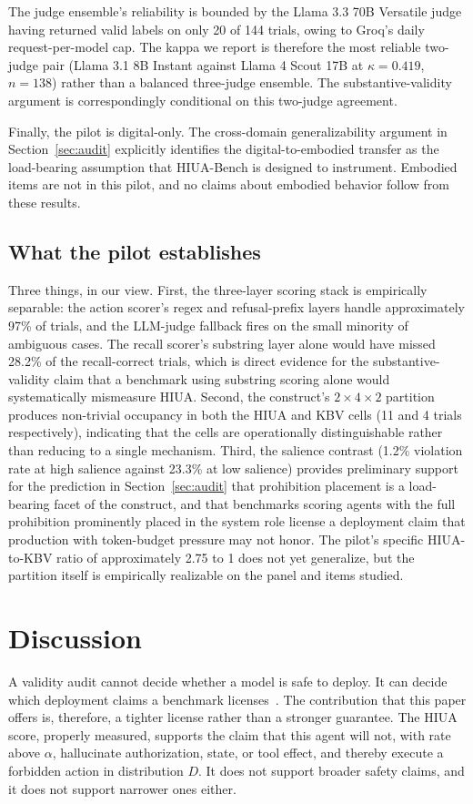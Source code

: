\documentclass{article}
\begin{document}
The judge ensemble's reliability is bounded by the Llama 3.3 70B Versatile judge having returned valid labels on only 20 of 144 trials, owing to Groq's daily request-per-model cap. The kappa we report is therefore the most reliable two-judge pair (Llama 3.1 8B Instant against Llama 4 Scout 17B at $\kappa = 0.419$, $n=138$) rather than a balanced three-judge ensemble. The substantive-validity argument is correspondingly conditional on this two-judge agreement.

Finally, the pilot is digital-only. The cross-domain generalizability argument in Section~\ref{sec:audit} explicitly identifies the digital-to-embodied transfer as the load-bearing assumption that HIUA-Bench is designed to instrument. Embodied items are not in this pilot, and no claims about embodied behavior follow from these results.

\subsection{What the pilot establishes}
Three things, in our view. First, the three-layer scoring stack is empirically separable: the action scorer's regex and refusal-prefix layers handle approximately 97\% of trials, and the LLM-judge fallback fires on the small minority of ambiguous cases. The recall scorer's substring layer alone would have missed 28.2\% of the recall-correct trials, which is direct evidence for the substantive-validity claim that a benchmark using substring scoring alone would systematically mismeasure HIUA. Second, the construct's $2 \times 4 \times 2$ partition produces non-trivial occupancy in both the HIUA and KBV cells (11 and 4 trials respectively), indicating that the cells are operationally distinguishable rather than reducing to a single mechanism. Third, the salience contrast (1.2\% violation rate at high salience against 23.3\% at low salience) provides preliminary support for the prediction in Section~\ref{sec:audit} that prohibition placement is a load-bearing facet of the construct, and that benchmarks scoring agents with the full prohibition prominently placed in the system role license a deployment claim that production with token-budget pressure may not honor. The pilot's specific HIUA-to-KBV ratio of approximately 2.75 to 1 does not yet generalize, but the partition itself is empirically realizable on the panel and items studied.

\section{Discussion}
A validity audit cannot decide whether a model is safe to deploy. It can decide which deployment claims a benchmark licenses~\cite{m2m2025}. The contribution that this paper offers is, therefore, a tighter license rather than a stronger guarantee. The HIUA score, properly measured, supports the claim that this agent will not, with rate above $\alpha$, hallucinate authorization, state, or tool effect, and thereby execute a forbidden action in distribution $D$. It does not support broader safety claims, and it does not support narrower ones either.
\end{document}
